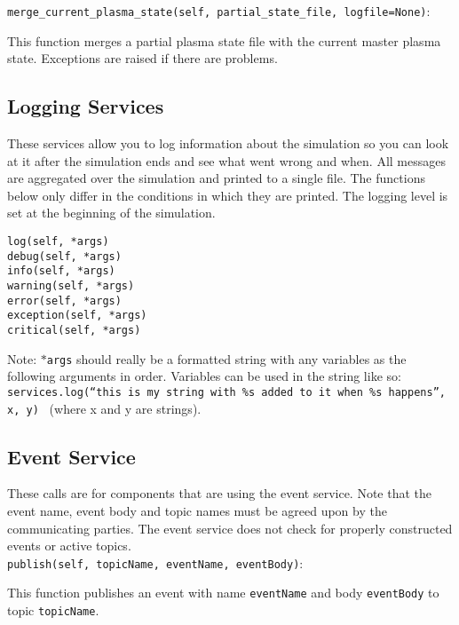 \texttt{merge\_current\_plasma\_state(self, partial\_state\_file, logfile=None)}:
\par
  This function merges a partial plasma state file with the current master 
  plasma state.  Exceptions are raised if there are problems.\\


\subsection{Logging Services}
\label{sec:log_services}
\par
These services allow you to log information about the simulation so you 
can look at it after the simulation ends and see what went wrong and when.  
All messages are aggregated over the simulation and printed to a single 
file.  The functions below only differ in the conditions in which they are 
printed.  The logging level is set at the beginning of the simulation.\\

\begin{verbatim}
log(self, *args)
debug(self, *args)
info(self, *args)
warning(self, *args)
error(self, *args)
exception(self, *args)
critical(self, *args)
\end{verbatim}
Note: \texttt{$\ast$args} should really be a formatted string with any variables as the following arguments in order.  
Variables can be used in the string like so:\\
  \texttt{services.log(``this is my string with \%s added to it when \%s happens'', x, y) }
(where x and y are strings).\\

\subsection{Event Service}
\label{sec:event_services}
\par
These calls are for components that are using the event service.  Note 
that the event name, event body and topic names must be agreed upon by the 
communicating parties.  The event service does not check for properly 
constructed events or active topics.\\

\texttt{publish(self, topicName, eventName, eventBody)}:
\par
  This function publishes an event with name \texttt{eventName} and body 
  \texttt{eventBody} to topic \texttt{topicName}.\\


